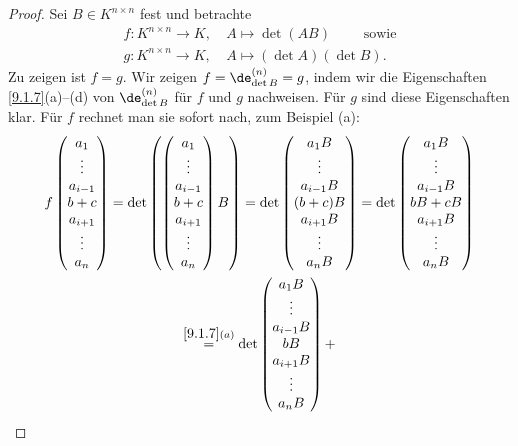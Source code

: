 \documentclass[../../main.tex]{subfiles}
\begin{document}
\begin{proof}
Sei $B\in K^{n\times n}$ fest und betrachte
\begin{align*}
f\colon K^{n\times n}\to K,&\ A\mapsto\det(AB)\qquad\text{ sowie}\\
g\colon K^{n\times n}\to K,&\ A\mapsto(\det A)(\det B).
\end{align*}
Zu zeigen ist $f=g$. Wir zeigen $f=\de_{\det B}^{(n)}=g$, indem wir die Eigenschaften \ref{9.1.7}(a)--(d) von $\de_{\det B}^{(n)}$ für $f$ und $g$ nachweisen. Für $g$ sind diese
Eigenschaften klar. Für $f$ rechnet man sie sofort nach, zum Beispiel (a):
\begin{multline*}
f\begin{pmatrix}a_1\\\vdots\\a_{i-1}\\b+c\\a_{i+1}\\\vdots\\a_n\end{pmatrix}=\det\begin{pmatrix}\begin{pmatrix}a_1\\\vdots\\a_{i-1}\\b+c\\a_{i+1}\\\vdots\\a_n\end{pmatrix}B\end{pmatrix}=\det\begin{pmatrix}a_1B\\\vdots\\a_{i-1}B\\(b+c)B\\a_{i+1}B\\\vdots\\a_nB\end{pmatrix}
=\det\begin{pmatrix}a_1B\\\vdots\\a_{i-1}B\\bB+cB\\a_{i+1}B\\\vdots\\a_nB\end{pmatrix}
\\\overset{\ref{9.1.7}(a)}=
\det\begin{pmatrix}a_1B\\\vdots\\a_{i-1}B\\bB\\a_{i+1}B\\\vdots\\a_nB\end{pmatrix}+

\end{multline*}
\end{proof}
\end{document}

